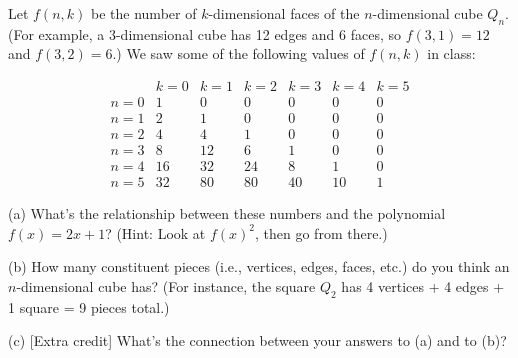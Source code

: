 \begin{PH}
Let $f(n,k)$ be the number of $k$-dimensional faces of the $n$-dimensional
cube $Q_n$.  (For example, a 3-dimensional cube has 12 edges and 6 faces,
so $f(3,1)=12$ and $f(3,2)=6$.)  We saw some of the following
values of $f(n,k)$ in class:

$$
\begin{array}{l|cccccc}
    & k=0 & k=1 & k=2 & k=3 & k=4 & k=5\\ \hline
n=0 & 1   & 0   & 0   & 0   & 0   & 0\\
n=1 & 2   & 1   & 0   & 0   & 0   & 0\\
n=2 & 4   & 4   & 1   & 0   & 0   & 0\\ 
n=3 & 8   & 12  & 6   & 1   & 0   & 0\\
n=4 & 16  & 32  & 24  & 8   & 1   & 0\\
n=5 & 32  & 80  & 80  & 40  & 10  & 1
\end{array}
$$

(a) What's the relationship between these numbers
and the polynomial $f(x)=2x+1$?  (Hint: Look at $f(x)^2$,
then go from there.)

(b) How many constituent pieces (i.e., vertices, edges, faces, etc.)
do you think
an $n$-dimensional cube has?  (For instance, the square $Q_2$
has 4 vertices + 4 edges + 1 square = 9 pieces total.)

(c) [Extra credit] What's the connection between your answers
to (a) and to (b)?
\end{PH}
\bigskip
